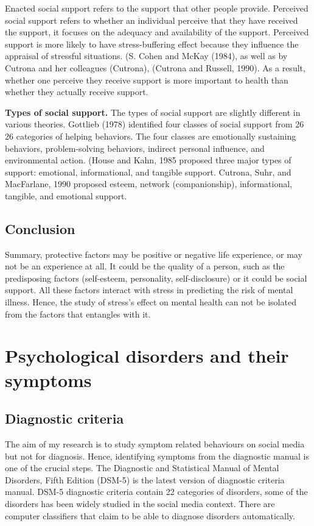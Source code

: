 Enacted social support refers to the support that other people provide. Perceived social support refers to whether an individual perceive that they have received the support, it focuses on the adequacy and availability of the support.  Perceived support is more likely to have stress-buffering effect because they influence the appraisal of stressful situations. (S. Cohen and McKay (1984), as well as by Cutrona and her colleagues (Cutrona), (Cutrona
and Russell, 1990). As a result, whether one perceive they receive support is more important to health than whether they actually receive support. 


\textbf{Types of social support.} The types of social support are slightly different in various theories. Gottlieb (1978) identified four classes of social support from 26  26 categories of helping behaviors. The four classes are emotionally sustaining behaviors, problem-solving behaviors, indirect personal influence, and environmental action. (House and Kahn, 1985 proposed three major types of support: emotional, informational, and tangible support. Cutrona, Suhr, and MacFarlane, 1990 proposed esteem, network (companionship), informational, tangible, and emotional support.


\subsection{Conclusion}
Summary, protective factors may be positive or negative life experience, or may not be an experience at all. It could be the quality of a person, such as the predisposing factors (self-esteem, personality, self-disclosure) or it could be social support. All these factors interact with stress in predicting the risk of mental illness. Hence, the study of stress's effect on mental health can not be isolated from the factors that entangles with it. 


\section{Psychological disorders and their symptoms}

\subsection{Diagnostic criteria}
The aim of my research is to study symptom related behaviours on social media but not for diagnosis. Hence, identifying symptoms from the diagnostic manual is one of the crucial steps. The Diagnostic and Statistical Manual of Mental Disorders, Fifth Edition (DSM-5) is the latest version of diagnostic criteria manual. DSM-5 diagnostic criteria contain 22 categories of disorders, some of the disorders has been widely studied in the social media context. There are computer classifiers that claim to be able to diagnose disorders automatically.

